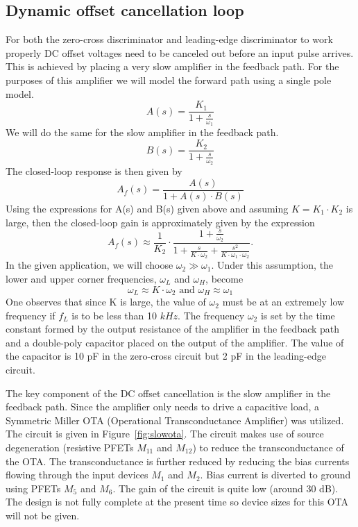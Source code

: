 \documentclass[12pt,oneside,final]{siuethesis}
\theoremstyle{definition}
\begin{document}
\subsection{Dynamic offset cancellation loop}
\par For both the zero-cross discriminator and leading-edge discriminator to work properly DC offset voltages need to be canceled out before an input pulse arrives. This is achieved by placing a very slow amplifier in the feedback path.  For the purposes of this amplifier we will model the forward path using a single pole model.
\begin{equation}
A(s) = \frac{K_1}{1 + \frac{s}{\omega_1}}
\end{equation}
We will do the same for the slow amplifier in the feedback path.
\begin{equation}
B(s) = \frac{K_2}{1 + \frac{s}{\omega_2}}
\end{equation}
The closed-loop response is then given by 
\begin{equation}
A_f(s) = \frac{A(s)}{1 + A(s) \cdot B(s)} 
\end{equation}
Using the expressions for A(s) and B(s) given above and assuming $K = K_1 \cdot K_2$ is large, then the closed-loop gain is approximately given by the expression 
\begin{equation}
A_f(s) \approx \frac{1}{K_2} \cdot \frac{1 + \frac{s}{\omega_2}}{1 + \frac{s}{K \cdot \omega_2} + \frac{s^2}{K \cdot \omega_1 \cdot \omega_2}}.
\end{equation}
In the given application, we will choose $\omega_2 \gg \omega_1$.  Under this assumption, the lower and upper corner frequencies, $\omega_L$ and $\omega_H$, become
\begin{equation}
\omega_L \approx K \cdot \omega_2 \text{ and } \omega_H \approx  \omega_1
\end{equation}
One observes that since K is large, the value of $\omega_2$ must be at an extremely low frequency if $f_L$ is to be less than 10 $kHz$.  The frequency $\omega_2$ is set by the time constant formed by the output resistance of the amplifier in the feedback path and a double-poly capacitor placed on the output of the amplifier.  The value of the capacitor is 10 pF in the zero-cross circuit but 2 pF in the leading-edge circuit.
\par The key component of the DC offset cancellation is the slow amplifier in the feedback path. Since the amplifier only needs to drive a capacitive load, a Symmetric Miller OTA (Operational Transconductance Amplifier) was utilized.  The circuit is given in Figure~\ref{fig:slowota}.  The circuit makes use of source degeneration (resistive PFETs $M_{11}$ and $M_{12}$) to reduce the transconductance of the OTA.  The transconductance is further reduced by reducing the bias currents flowing through the input devices $M_1$ and $M_2$.  Bias current is diverted to ground using PFETs $M_5$ and $M_6$. The gain of the circuit is quite low (around 30 dB). The design is not fully complete at the present time so device sizes for this OTA will not be given. 
\end{document}
